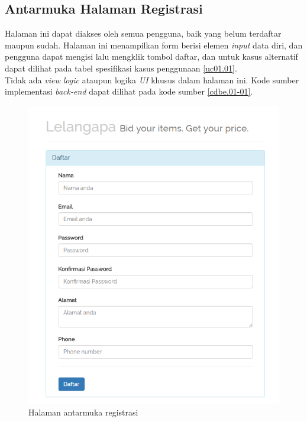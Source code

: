 \subsection{Antarmuka Halaman Registrasi}    
    Halaman ini dapat diakses oleh semua pengguna, baik yang belum terdaftar maupun sudah. Halaman ini menampilkan form berisi elemen \textit{input} data diri, dan pengguna dapat mengisi lalu mengklik tombol daftar, dan untuk kasus alternatif dapat dilihat pada tabel spesifikasi kasus penggunaan \ref{uc01.01}.\\
	\indent Tidak ada \textit{view logic} ataupun logika \textit{UI} khusus dalam halaman ini. Kode sumber implementasi \textit{back-end} dapat dilihat pada kode sumber \ref{cdbe.01-01}.

  \begin{figure}[H]
    \centering
    \includegraphics[width=\textwidth]{images/bab4/ui/01-01.png}
    \caption{Halaman antarmuka registrasi}
    \label{ui.01-01}
  \end{figure}
  
